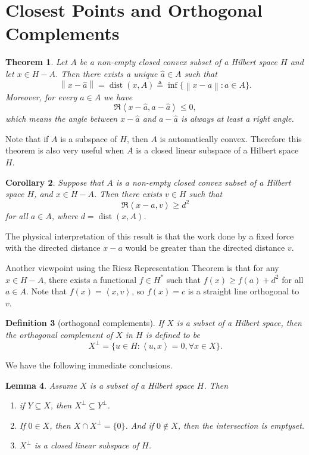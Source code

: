 \documentclass[12pt,a4paper]{report}
\numberwithin{equation}{section}
\theoremstyle{mystyle}
\newtheorem{definition}{Definition}[section]
\newtheorem{theorem}[definition]{Theorem}
\newtheorem{lemma}[definition]{Lemma}
\newtheorem{corollary}[definition]{Corollary}
\newcommand{\norm}[1]{\left\lVert #1 \right\rVert}
\newcommand{\inner}[1]{\left\langle #1 \right\rangle}
\newcommand{\dist}{\operatorname{dist}}
\begin{document}
	
	
	\section{Closest Points and Orthogonal Complements}
	\begin{theorem}
		Let $A$ be a non-empty closed convex subset of a Hilbert space $H$ and let $x\in H-A$. Then there exists a unique $\hat{a}\in A$ such that
		$$
		\norm{x-\hat{a}}=\dist(x,A)\triangleq \inf\{\norm{x-a}:a\in A\}.
		$$
		Moreover, for every $a\in A$ we have
		\begin{equation}
			\Re\inner{x-\hat{a},a-\hat{a}}\leq 0,
		\end{equation}
		which means the angle between $x-\hat{a}$ and $a-\hat{a}$ is always at least a right angle.
	\end{theorem}
	Note that if $A$ is a subspace of $H$, then $A$ is automatically convex. Therefore this theorem is also very useful when $A$ is a closed linear subspace of a Hilbert space $H$.
	
	\begin{corollary}
		Suppose that $A$ is a non-empty closed convex subset of a Hilbert space $H$, and $x\in H-A$. Then there exists $v\in H$ such that
		\begin{equation}
			\Re\inner{x-a,v}\geq d^2
		\end{equation}
		for all $a\in A$, where $d=\dist(x,A)$.
	\end{corollary}
	The physical interpretation of this result is that the work done by a fixed force with the directed distance $x-a$ would be greater than the directed distance $v$.
	
	Another viewpoint using the Riesz Representation Theorem is that for any $x\in H-A$, there exists a functional $f\in H^*$ such that $f(x)\geq f(a)+d^2$ for all $a\in A$. Note that $f(x)=\inner{x,v}$, so $f(x)=c$ is a straight line orthogonal to $v$.
	
	\begin{definition}[orthogonal complements]
		If $X$ is a subset of a Hilbert space, then the \emph{orthogonal complement} of $X$ in $H$ is defined to be 
		$$
		X^\perp = \{u\in H:\inner{u,x}=0,\forall x\in X\}.
		$$
	\end{definition}
	We have the following immediate conclusions.
	\begin{lemma}
		Assume $X$ is a subset of a Hilbert space $H$. Then
		\begin{enumerate}
			\item if $Y\subseteq X$, then $X^\perp \subseteq Y^\perp$.
			\item If $0\in X$, then $X\cap X^\perp =\{0\}$. And if $0\notin X$, then the intersection is emptyset.
			\item $X^\perp$ is a closed linear subspace of $H$.
		\end{enumerate}
	\end{lemma}
\end{document}
